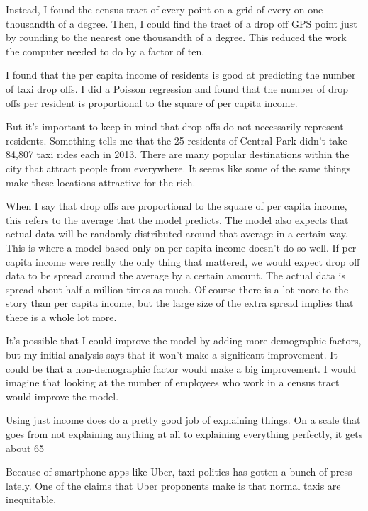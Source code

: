 Instead, I found the census tract of every point on a grid of every on one-thousandth of a degree. Then, I could find the tract of a drop off GPS point just by rounding to the nearest one thousandth of a degree. This reduced the work the computer needed to do by a factor of ten.

I found that the per capita income of residents is good at predicting the number of taxi drop offs. I did a Poisson regression and found that the number of drop offs per resident is proportional to the square of per capita income.

But it's important to keep in mind that drop offs do not necessarily represent residents. Something tells me that the 25 residents of Central Park didn't take 84,807 taxi rides each in 2013. There are many popular destinations within the city that attract people from everywhere. It seems like some of the same things make these locations attractive for the rich.

When I say that drop offs are proportional to the square of per capita income, this refers to the average that the model predicts. The model also expects that actual data will be randomly distributed around that average in a certain way. This is where a model based only on per capita income doesn't do so well. If per capita income were really the only thing that mattered, we would expect drop off data to be spread around the average by a certain amount. The actual data is spread about half a million times as much. Of course there is a lot more to the story than per capita income, but the large size of the extra spread implies that there is a whole lot more.

It's possible that I could improve the model by adding more demographic factors, but my initial analysis says that it won't make a significant improvement. It could be that a non-demographic factor would make a big improvement. I would imagine that looking at the number of employees who work in a census tract would improve the model. 

Using just income does do a pretty good job of explaining things. On a scale that goes from not explaining anything at all to explaining everything perfectly, it gets about 65%



Because of smartphone apps like Uber, taxi politics has gotten a bunch of press lately. One of the claims that Uber proponents make is that normal taxis are inequitable.

